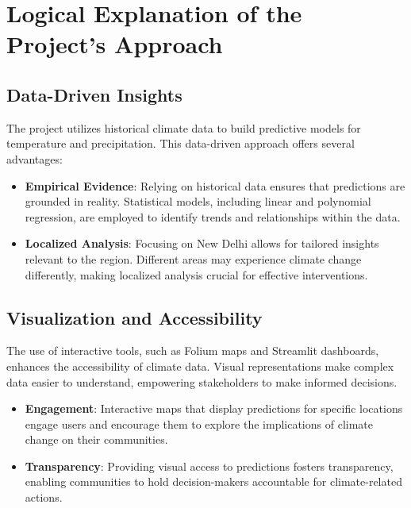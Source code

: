 \documentclass{article}
\begin{document}
\section{Logical Explanation of the Project's Approach}

\subsection{Data-Driven Insights}

The project utilizes historical climate data to build predictive models for temperature and precipitation. This data-driven approach offers several advantages:

\begin{itemize}
    \item \textbf{Empirical Evidence}: Relying on historical data ensures that predictions are grounded in reality. Statistical models, including linear and polynomial regression, are employed to identify trends and relationships within the data.
    
    \item \textbf{Localized Analysis}: Focusing on New Delhi allows for tailored insights relevant to the region. Different areas may experience climate change differently, making localized analysis crucial for effective interventions.
\end{itemize}

\subsection{Visualization and Accessibility}

The use of interactive tools, such as Folium maps and Streamlit dashboards, enhances the accessibility of climate data. Visual representations make complex data easier to understand, empowering stakeholders to make informed decisions.

\begin{itemize}
    \item \textbf{Engagement}: Interactive maps that display predictions for specific locations engage users and encourage them to explore the implications of climate change on their communities.
    
    \item \textbf{Transparency}: Providing visual access to predictions fosters transparency, enabling communities to hold decision-makers accountable for climate-related actions.
\end{itemize}
\end{document}
